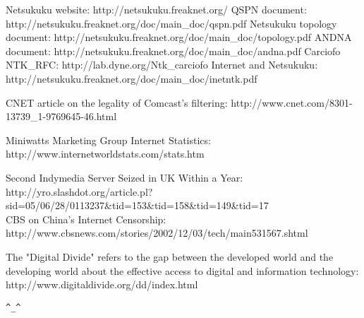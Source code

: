 \documentclass[a4paper]{article}
\newcommand{\href}[2]{ #1 }
\begin{document}
\begin{thebibliography}{99}
	 Netsukuku website:
		\href{http://netsukuku.freaknet.org/}{http://netsukuku.freaknet.org/}
	 QSPN document:
		\href{http://netsukuku.freaknet.org/doc/main\_doc/qspn.pdf}{http://netsukuku.freaknet.org/doc/main\_doc/qspn.pdf}
	 Netsukuku topology document:
		\href{http://netsukuku.freaknet.org/doc/main\_doc/topology.pdf}{http://netsukuku.freaknet.org/doc/main\_doc/topology.pdf}
	 ANDNA document:
		\href{http://netsukuku.freaknet.org/doc/main\_doc/andna.pdf}{http://netsukuku.freaknet.org/doc/main\_doc/andna.pdf}
	 Carciofo NTK\_RFC:
		\href{http://lab.dyne.org/Ntk\_carciofo}{http://lab.dyne.org/Ntk\_carciofo}
	  Internet and Netsukuku:
		\href{http://netsukuku.freaknet.org/doc/main\_doc/inetntk.pdf}{http://netsukuku.freaknet.org/doc/main\_doc/inetntk.pdf}

	 CNET article on the legality of Comcast's filtering:
		\href{http://www.cnet.com/8301-13739_1-9769645-46.html}{http://www.cnet.com/8301-13739_1-9769645-46.html}

	 Miniwatts Marketing Group Internet Statistics:
		\href{http://www.internetworldstats.com/stats.htm}{http://www.internetworldstats.com/stats.htm}


	  Second Indymedia Server Seized in UK Within a Year:
		\href{http://yro.slashdot.org/article.pl?sid=05/06/28/0113237&tid=153&tid=158&tid=149&tid=17}{http://yro.slashdot.org/article.pl?sid=05/06/28/0113237&tid=153&tid=158&tid=149&tid=17} \\
                 CBS on China's Internet Censorship:
		\href{http://www.cbsnews.com/stories/2002/12/03/tech/main531567.shtml}{http://www.cbsnews.com/stories/2002/12/03/tech/main531567.shtml}

         The "Digital Divide" refers to the gap
        between the developed world and the developing world about the
        effective access to digital and information technology:
 		\href{http://www.digitaldivide.org/dd/index.html}{http://www.digitaldivide.org/dd/index.html}
\end{thebibliography}
\newpage

\begin{center}
\verb|^_^|
\end{center}
\end{document}
